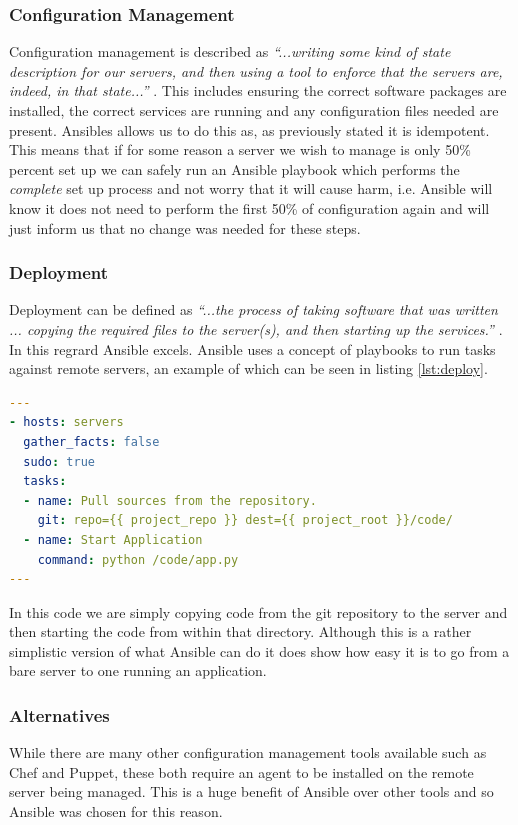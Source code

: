 \documentclass{article}
\begin{document}
\subsubsection{Configuration Management}
Configuration management is described as \textit{``...writing some kind of state description for our servers, and then using a tool to enforce that the servers are, indeed, in that state...''} \citep{Hochstein2015}. This includes ensuring the correct software packages are installed, the correct services are running and any configuration files needed are present. Ansibles allows us to do this as, as previously stated it is idempotent. This means that if for some reason a server we wish to manage is only 50\% percent set up we can safely run an Ansible playbook which performs the \textit{complete} set up process and not worry that it will cause harm, i.e. Ansible will know it does not need to perform the first 50\% of configuration again and will just inform us that no change was needed for these steps.


\subsubsection{Deployment}
Deployment can be defined as \textit{``...the process of taking software that was written ... copying the required files to the server(s), and then starting up the services.''} \citep{Hochstein2015}. In this regrard Ansible excels. Ansible uses a concept of playbooks to run tasks against remote servers, an example of which can be seen in listing \ref{lst:deploy}.

\newpage
\begin{lstlisting}[float,floatplacement=!h,language=yaml,caption={A Simple Playbook To Deploy and Run Code},label={lst:deploy},basicstyle=\scriptsize]
---
- hosts: servers
  gather_facts: false
  sudo: true
  tasks:
  - name: Pull sources from the repository.
    git: repo={{ project_repo }} dest={{ project_root }}/code/
  - name: Start Application
    command: python /code/app.py
---
\end{lstlisting}

In this code we are simply copying code from the git repository to the server and then starting the code from within that directory. Although this is a rather simplistic version of what Ansible can do it does show how easy it is to go from a bare server to one running an application.


\subsubsection{Alternatives}
\label{subs:Ansible-alt}
While there are many other configuration management tools available such as Chef and Puppet, these both require an agent to be installed on the remote server being managed. This is a huge benefit of Ansible over other tools and so Ansible was chosen for this reason. 
\end{document}
